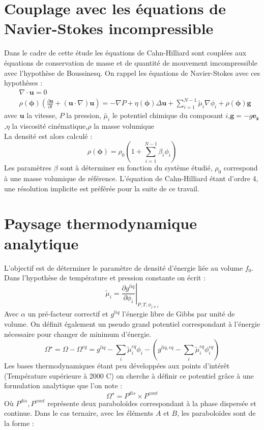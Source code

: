 \documentclass[a4paper,11pt,fleqn]{report}    %
\begin{document}
\section{Couplage avec les équations de Navier-Stokes incompressible}
Dans le cadre de cette étude les équations de Cahn-Hilliard sont couplées aux équations de conservation de masse et de quantité de mouvement imcompressible avec l'hypothèse de Boussinesq. On rappel les équations de Navier-Stokes avec ces hypothèses :
\begin{align}
&\nabla \cdot \mathbf{u} = 0\\
&\rho(\bm{\phi}) \left (\frac{\partial \mathbf{u}}{\partial t} + (\mathbf{u} \cdot {\nabla})\mathbf{u}\right) = -{\nabla} P +\eta(\bm{\phi}){\Delta} \mathbf{u}+\sum_{i=1}^{N-1} \tilde\mu_i{\nabla} \phi_i + \rho(\bm{\phi}) \mathbf{g}
\end{align}
avec $\mathbf{u}$ la vitesse, $P$ la pression, $\tilde{\mu_i}$ le potentiel chimique du composant $i$,$\mathbf{g} = -g \mathbf{e_z}$,$\eta$ la viscosité cinématique,$\rho$ la masse volumique\\
La densité est alors calculé : 
\begin{equation}
	\rho(\bm{\phi}) = \rho_0\left(1+\sum_{i=1}^{N-1}\beta_i \phi_i\right)
\end{equation}
Les paramètres $\beta$ sont à déterminer en fonction du système étudié, $\rho_0$ correspond à une masse volumique de référence. L'équation de Cahn-Hilliard étant d'ordre 4, une résolution implicite est préférée pour la suite de ce travail.
\section{Paysage thermodynamique analytique}
L'objectif est de déterminer le paramètre de densité d'énergie liée au volume $f_0$. Dans l'hypothèse de température et pression constante on écrit : 
\begin{equation}\label{calul_potentiel}
\tilde{\mu}_i = \left.\frac{\partial g^{liq}}{\partial \phi_i}\right|_{P,T,\phi_{j\neq i}} 
\end{equation}
Avec $\alpha$ un pré-facteur correctif et $g^{liq}$ l'énergie libre de Gibbs par unité de volume. On définit également un pseudo grand potentiel correspondant à l'énergie nécessaire pour changer de minimum d'énergie.
\begin{equation}
\Omega^{\star} =\Omega - \Omega^{eq} =  {g}^{liq} - \sum_i \tilde{\mu}_i^{eq}\phi_i - \left( {g}^{liq,eq} -  \sum_i \tilde{\mu}_i^{eq}\phi_i^{eq} \right) 
\end{equation}
Les bases thermodynamiques étant peu développées aux points d'intérêt (Température supérieure à 2000 \textdegree C) on cherche à définir ce potentiel grâce à une formulation analytique que l'on note :
\begin{equation}\label{double_puit}
	\Omega^{\star}  = P^{dis} \times P^{cont}
\end{equation}
Où $P^{dis}, P^{cont}$ représente deux paraboloïdes correspondant à la phase dispersée et continue. Dans le cas ternaire, avec les éléments $A$ et $B$, les paraboloïdes sont de la forme : 
\end{document}
